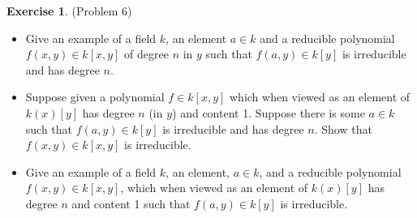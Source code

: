 \documentclass[12pt, psamsfonts]{amsart}
\theoremstyle{definition}
\newtheorem*{exer}{Exercise}
\theoremstyle{remark}
\numberwithin{equation}{section}
\begin{document}
\begin{exer}{(Problem 6)}
  $ $
  \begin{itemize}
    \item
      Give an example of a field $k$, an element $a \in k$ and a reducible polynomial $f(x, y) \in k[x, y]$ of degree $n$ in $y$ such that $f(a, y) \in k[y]$ is irreducible and has degree $n$.
    \item
      Suppose given a polynomial $f \in k[x, y]$ which when viewed as an element of $k(x)[y]$ has degree $n$ (in $y$) and content 1.
      Suppose there is some $a \in k$ such that $f(a, y) \in k[y]$ is irreducible and has degree $n$.
      Show that $f(x, y) \in k[x, y]$ is irreducible.
    \item
      Give an example of a field $k$, an element, $a \in k$, and a reducible polynomial $f(x, y) \in k[x, y]$, which when viewed as an element of $k(x)[y]$ has degree $n$ and content 1 such that $f(a, y) \in k[y]$ is irreducible.
  \end{itemize}
\end{exer}
\end{document}
